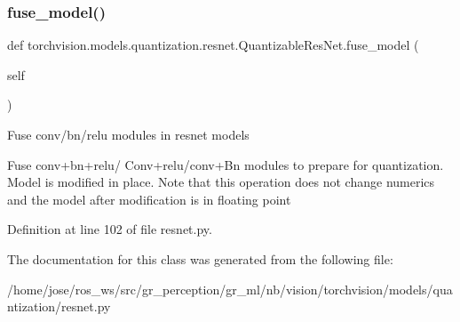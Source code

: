 \subsubsection{\texorpdfstring{fuse\+\_\+model()}{fuse\_model()}}
{\footnotesize\ttfamily def torchvision.\+models.\+quantization.\+resnet.\+Quantizable\+Res\+Net.\+fuse\+\_\+model (\begin{DoxyParamCaption}\item[{}]{self }\end{DoxyParamCaption})}

\begin{DoxyVerb}Fuse conv/bn/relu modules in resnet models

Fuse conv+bn+relu/ Conv+relu/conv+Bn modules to prepare for quantization.
Model is modified in place.  Note that this operation does not change numerics
and the model after modification is in floating point
\end{DoxyVerb}
 

Definition at line 102 of file resnet.\+py.



The documentation for this class was generated from the following file\+:\begin{DoxyCompactItemize}
\item 
/home/jose/ros\+\_\+ws/src/gr\+\_\+perception/gr\+\_\+ml/nb/vision/torchvision/models/quantization/resnet.\+py\end{DoxyCompactItemize}
